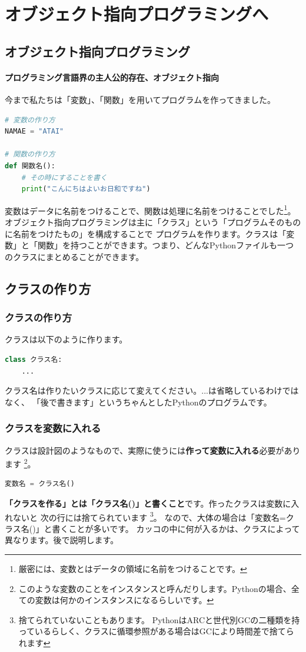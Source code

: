 \documentclass[12pt, a4paper, dvipdfmx]{book}
\begin{document}
\chapter{オブジェクト指向プログラミングへ}
\section{オブジェクト指向プログラミング}
\subsubsection{プログラミング言語界の主人公的存在、オブジェクト指向}
今まで私たちは「変数」、「関数」を用いてプログラムを作ってきました。
\begin{lstlisting}[caption=復習,label=sample, language=Python]
# 変数の作り方
NAMAE = "ATAI"

# 関数の作り方
def 関数名():
    # その時にすることを書く
    print("こんにちはよいお日和ですね")
\end{lstlisting}
変数はデータに名前をつけることで、関数は処理に名前をつけることでした\footnote{厳密には、変数とはデータの領域に名前をつけることです。}。
オブジェクト指向プログラミングは主に「クラス」という「プログラムそのものに名前をつけたもの」を構成することで
プログラムを作ります。クラスは「変数」と「関数」を持つことができます。つまり、どんなPythonファイルも一つのクラスにまとめることができます。
\section{クラスの作り方}
\subsection{クラスの作り方}
クラスは以下のように作ります。
\newpage
\begin{lstlisting}[caption=クラスの作り方,label=sample, language=Python]
class クラス名:
    ...
\end{lstlisting}
クラス名は作りたいクラスに応じて変えてください。...は省略しているわけではなく、
「後で書きます」というちゃんとしたPythonのプログラムです。

\subsection{クラスを変数に入れる}
クラスは設計図のようなもので、実際に使うには\textbf{作って変数に入れる}必要があります
\footnote{このような変数のことをインスタンスと呼んだりします。Pythonの場合、全ての変数は何かのインスタンスになるらしいです。}。
\begin{lstlisting}[caption=クラスを変数に入れる,label=sample, language=Python]
変数名 = クラス名()
\end{lstlisting}
\textbf{「クラスを作る」とは「クラス名()」と書くこと}です。作ったクラスは変数に入れないと
次の行には捨てられています
\footnote{捨てられていないこともあります。
  PythonはARCと世代別GCの二種類を持っているらしく、クラスに循環参照がある場合はGCにより時間差で捨てられます}。
なので、大体の場合は「変数名=クラス名()」と書くことが多いです。
カッコの中に何が入るかは、クラスによって異なります。後で説明します。
\end{document}
